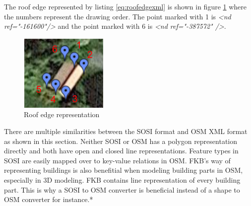 The roof edge represented by listing \ref{eq:roofedgexml} is shown in figure \ref{fig:roofedgeeks} where the numbers represent the drawing order. The point marked with 1 is \textit{<nd ref="-161600"/>} and the point marked with 6 is \textit{<nd ref="-387572" />}. 

\begin{figure}[H]
    \centering
    \includegraphics[scale=0.9]{figures/FixedByMe/sosiArea.png}
    \caption{Roof edge representation}
    \label{fig:roofedgeeks}
\end{figure} 


There are multiple similarities between the SOSI format and OSM XML format as shown in this section. Neither SOSI or OSM has a polygon representation directly and both have open and closed line representations. Feature types in SOSI are easily mapped over to key-value relations in OSM. FKB's way of representing buildings is also benefitial when modeling building parts in OSM, especially in 3D modeling. FKB contains line representation of every building part. This is why a SOSI to OSM converter is beneficial instead of a shape to OSM converter for instance.* %
